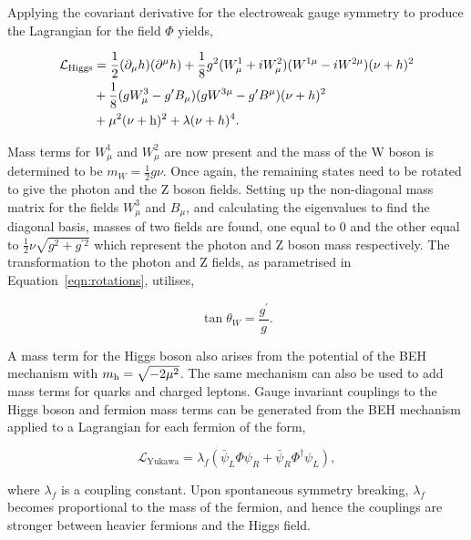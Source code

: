 Applying the covariant derivative for the electroweak gauge symmetry to produce the Lagrangian for the field $\Phi$ yields,

\begin{align}
\begin{split}
\mathcal{L}_{\text{Higgs}} &= \frac{1}{2}(\partial_{\mu}h)(\partial^{\mu}h) + \frac{1}{8} g^{2} (W_{\mu}^{1} + i W_{\mu}^{2})(W^{1\mu} - i W^{2\mu})(\nu + h)^2 \\
&+ \frac{1}{8} (g W_{\mu}^{3} - g' B_{\mu})(g W^{3\mu} - g' B^{\mu})(\nu + h)^2  \\
&+ \mu^2 (\nu + {\text{h}})^2 + \lambda (\nu + h)^4.
\end{split}
\end{align}

Mass terms for $W_{\mu}^{1}$ and $W_{\mu}^{2}$ are now present and the mass of the W boson is determined to be $m_W = \frac{1}{2}g\nu$.
Once again, the remaining states need to be rotated to give the photon and the Z boson fields.
Setting up the non-diagonal mass matrix for the fields $W_{\mu}^{3}$ and $B_{\mu}$, and calculating the eigenvalues to find the diagonal basis, masses of two fields are found, one equal to 0 and the other equal to $\frac{1}{2} \nu \sqrt{g^2 + g^{\prime 2}}$ which represent the photon and Z boson mass respectively.
The transformation to the photon and Z fields, as parametrised in Equation~\ref{eqn:rotations}, utilises,

\begin{equation}
\tan\theta_W = \frac{g^{\prime}}{g}.
\end{equation}

A mass term for the Higgs boson also arises from the potential of the \ac{BEH} mechanism with $m_{{\text{h}}} = \sqrt{-2\mu^2}$. 
The same mechanism can also be used to add mass terms for quarks and charged leptons.
Gauge invariant couplings to the Higgs boson and fermion mass terms can be generated from the \ac{BEH} mechanism applied to a Lagrangian for each fermion of the form,

\begin{equation}
\mathcal{L}_{\text{Yukawa}} = \lambda_f (\bar{\psi}_{L}\Phi\psi_{R} + \bar{\psi}_{R}\Phi^{\dagger}\psi_{L}),
\end{equation}

where $\lambda_f$ is a coupling constant.
Upon spontaneous symmetry breaking, $\lambda_{f}$ becomes proportional to the mass of the fermion, and hence the couplings are stronger between heavier fermions and the Higgs field.

